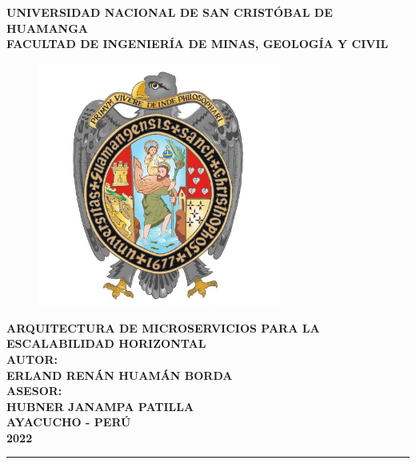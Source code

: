 \begin{titlepage}

\centering
  { \fontsize{18pt}{\baselineskip}\selectfont \textbf{UNIVERSIDAD NACIONAL DE SAN CRISTÓBAL DE HUAMANGA} }\\[0.25cm]
  { \fontsize{16pt}{\baselineskip}\selectfont \textbf{FACULTAD DE INGENIERÍA DE MINAS, GEOLOGÍA Y CIVIL} }\\[0.25cm]

  \begin{figure}[htb]
    \centering
    \includegraphics[height=8cm]{src/assets/unsch_logo.jpg}
  \end{figure}

\vspace{0.5cm}
{\fontsize{14pt}{ \baselineskip}\selectfont \textbf{
  ARQUITECTURA DE MICROSERVICIOS PARA LA ESCALABILIDAD HORIZONTAL
}}\\[0.5cm]
{\fontsize{14pt}{ \baselineskip}\selectfont \textbf{AUTOR:}}\\[0.5cm]
{\fontsize{14pt}{ \baselineskip}\selectfont \textbf{ERLAND RENÁN HUAMÁN BORDA}}\\[0.5cm]
{\fontsize{14pt}{ \baselineskip}\selectfont \textbf{ASESOR:}}\\[0.5cm]
{\fontsize{14pt}{ \baselineskip}\selectfont \textbf{HUBNER JANAMPA PATILLA}}\\[0.5cm]

\vfill
{\fontsize{14pt}{ \baselineskip}\selectfont \textbf{AYACUCHO - PERÚ}}\\[0.5cm]
{\fontsize{14pt}{ \baselineskip}\selectfont \textbf{2022}}
\singlespacing
\rule{132mm}{0.25mm}\\

\end{titlepage}
\restoregeometry
\newpage
